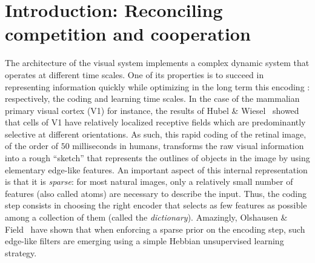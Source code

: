 \documentclass[vision,article,submit,oneauthor,pdftex]{Definitions/mdpi}
\newcommand{\seeFig}[1]{Figure~\ref{fig:#1}}%
\begin{document}
\section{Introduction: Reconciling competition and cooperation}\label{introduction}
The architecture of the visual system implements a complex dynamic system that operates at different time scales. One of its properties is to succeed in representing information quickly while optimizing in the long term this encoding : respectively, the coding and learning time scales. In the case of the mammalian primary visual cortex (V1) for instance, the results of Hubel \& Wiesel~\cite{Hubel68} showed that cells of V1 have relatively localized receptive fields which are predominantly selective at different orientations. As such, this rapid coding of the retinal image, of the order of $50$ milliseconds in humans, transforms the raw visual information into a rough ``sketch'' that represents the outlines of objects in the image by using elementary edge-like features. An important aspect of this internal representation is that it is \emph{sparse}: for most natural images, only a relatively small number of features (also called atoms) are necessary to describe the input. Thus, the coding step consists in choosing the right encoder that selects as few features as possible among a collection of them (called the \emph{dictionary}). Amazingly, Olshausen \& Field~\cite{Olshausen96} have shown that when enforcing a sparse prior on the encoding step, such edge-like filters are emerging using a simple Hebbian unsupervised learning strategy. %
\end{document}
